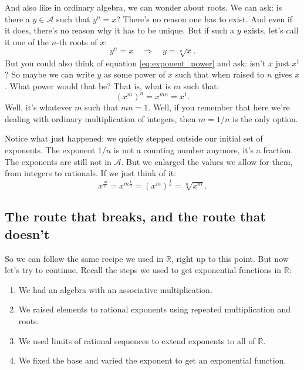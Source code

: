 And also like in ordinary algebra, we can wonder about roots. We can ask: is there a $y \in \mathcal{A}$ such that $y^n = x$? There's no reason one has to exist. And even if it does, there's no reason why it has to be unique. But if such a $y$ exists, let's call it one of the $n$-th roots of $x$:
\begin{equation}
    y^n = x \quad \Rightarrow \quad y = \sqrt[n]{x}.
\end{equation}
But you could also think of equation \eqref{eq:exponent_power} and ask: isn't $x$ just $x^1$? So maybe we can write $y$ as some power of $x$ such that when raised to $n$ gives $x$. What power would that be? That is, what is $m$ such that:
\begin{equation}
    (x^m)^n = x^{mn} = x^1.
\end{equation}
Well, it's whatever $m$ such that $mn = 1$. Well, if you remember that here we're dealing with ordinary multiplication of integers, then $m = 1/n$ is the only option.

Notice what just happened: we quietly stepped outside our initial set of exponents. The exponent $1/n$ is not a counting number anymore, it's a fraction. The exponents are still not in $\mathcal{A}$. But we enlarged the values we allow for them, from integers to rationals. If we just think of it:
\begin{equation}
    x^{\frac{m}{n}} = x^{m \frac{1}{n}} = (x^m)^{\frac{1}{n}} = \sqrt[n]{x^m}.
\end{equation}

\subsection{The route that breaks, and the route that doesn't}

So we can follow the same recipe we used in $\mathbb{R}$, right up to this point. But now let's try to continue. Recall the steps we used to get exponential functions in $\mathbb{R}$:

\begin{enumerate}
    \item \label{item:step_algebra} We had an algebra with an associative multiplication. \checkmark
    \item \label{item:step_rational} We raised elements to rational exponents using repeated multiplication and roots. \checkmark
    \item \label{item:step_real} We used limits of rational sequences to extend exponents to all of $\mathbb{R}$.
    \item \label{item:step_exp} We fixed the base and varied the exponent to get an exponential function.
\end{enumerate}

